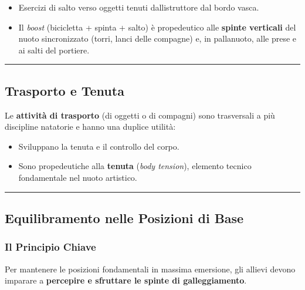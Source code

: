 \documentclass[a4paper,11pt]{article}
\providecommand{\tightlist}{%
  \setlength{\itemsep}{0pt}\setlength{\parskip}{0pt}}
\begin{document}
\begin{itemize}
      \tightlist
      \item
            Esercizi di salto verso oggetti tenuti dall\textquotesingle istruttore
            dal bordo vasca.
      \item
            Il \emph{boost} (bicicletta + spinta + salto) è propedeutico alle
            \textbf{spinte verticali} del nuoto sincronizzato (torri, lanci delle
            compagne) e, in pallanuoto, alle prese e ai salti del portiere.
\end{itemize}

\begin{center}\rule{0.5\linewidth}{0.5pt}\end{center}

\subsection{Trasporto e Tenuta}\label{trasporto-e-tenuta}

Le \textbf{attività di trasporto} (di oggetti o di compagni) sono
trasversali a più discipline natatorie e hanno una duplice utilità:

\begin{itemize}
      \tightlist
      \item
            Sviluppano la tenuta e il controllo del corpo.
      \item
            Sono propedeutiche alla \textbf{tenuta} (\emph{body tension}),
            elemento tecnico fondamentale nel nuoto artistico.
\end{itemize}

\begin{center}\rule{0.5\linewidth}{0.5pt}\end{center}

\subsection{Equilibramento nelle Posizioni di
      Base}\label{equilibramento-nelle-posizioni-di-base}

\subsubsection{Il Principio Chiave}\label{il-principio-chiave}

Per mantenere le posizioni fondamentali in massima emersione, gli
allievi devono imparare a \textbf{percepire e sfruttare le spinte di
      galleggiamento}.
\end{document}
